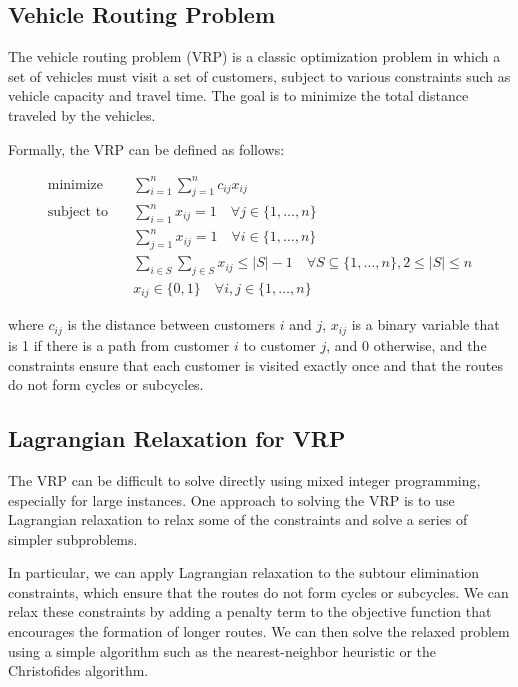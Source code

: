 \subsection{Vehicle Routing Problem}

The vehicle routing problem (VRP) is a classic optimization problem in which a set of vehicles must visit a set of customers, subject to various constraints such as vehicle capacity and travel time. The goal is to minimize the total distance traveled by the vehicles.

Formally, the VRP can be defined as follows:

\begin{align*}
\text{minimize} \quad & \sum_{i=1}^n \sum_{j=1}^n c_{ij} x_{ij} \\
\text{subject to} \quad & \sum_{i=1}^n x_{ij} = 1 \quad \forall j \in \{1,\dots,n\} \\
& \sum_{j=1}^n x_{ij} = 1 \quad \forall i \in \{1,\dots,n\} \\
& \sum_{i \in S} \sum_{j \in S} x_{ij} \leq |S| - 1 \quad \forall S \subseteq \{1,\dots,n\}, 2 \leq |S| \leq n \\
& x_{ij} \in \{0,1\} \quad \forall i,j \in \{1,\dots,n\}
\end{align*}

where $c_{ij}$ is the distance between customers $i$ and $j$, $x_{ij}$ is a binary variable that is 1 if there is a path from customer $i$ to customer $j$, and 0 otherwise, and the constraints ensure that each customer is visited exactly once and that the routes do not form cycles or subcycles.

\subsection{Lagrangian Relaxation for VRP}

The VRP can be difficult to solve directly using mixed integer programming, especially for large instances. One approach to solving the VRP is to use Lagrangian relaxation to relax some of the constraints and solve a series of simpler subproblems.

In particular, we can apply Lagrangian relaxation to the subtour elimination constraints, which ensure that the routes do not form cycles or subcycles. We can relax these constraints by adding a penalty term to the objective function that encourages the formation of longer routes. We can then solve the relaxed problem using a simple algorithm such as the nearest-neighbor heuristic or the Christofides algorithm.

